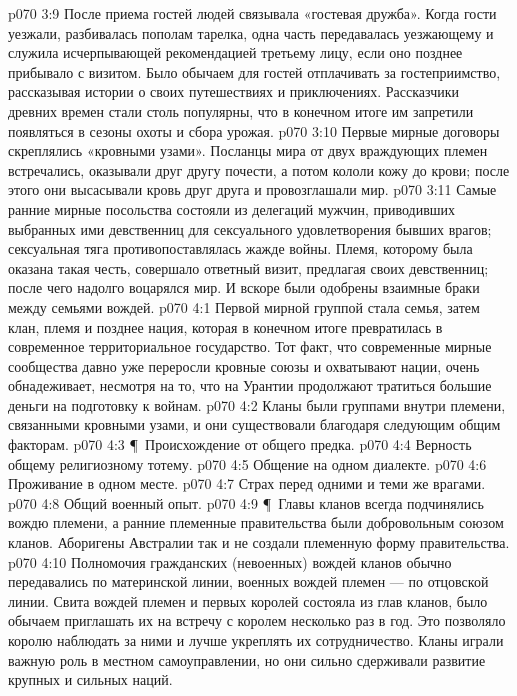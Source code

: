 \vs p070 3:9 После приема гостей людей связывала «гостевая дружба». Когда гости уезжали, разбивалась пополам тарелка, одна часть передавалась уезжающему и служила исчерпывающей рекомендацией третьему лицу, если оно позднее прибывало с визитом. Было обычаем для гостей отплачивать за гостеприимство, рассказывая истории о своих путешествиях и приключениях. Рассказчики древних времен стали столь популярны, что в конечном итоге им запретили появляться в сезоны охоты и сбора урожая.
\vs p070 3:10 Первые мирные договоры скреплялись «кровными узами». Посланцы мира от двух враждующих племен встречались, оказывали друг другу почести, а потом кололи кожу до крови; после этого они высасывали кровь друг друга и провозглашали мир.
\vs p070 3:11 Самые ранние мирные посольства состояли из делегаций мужчин, приводивших выбранных ими девственниц для сексуального удовлетворения бывших врагов; сексуальная тяга противопоставлялась жажде войны. Племя, которому была оказана такая честь, совершало ответный визит, предлагая своих девственниц; после чего надолго воцарялся мир. И вскоре были одобрены взаимные браки между семьями вождей.
\vs p070 4:1 Первой мирной группой стала семья, затем клан, племя и позднее нация, которая в конечном итоге превратилась в современное территориальное государство. Тот факт, что современные мирные сообщества давно уже переросли кровные союзы и охватывают нации, очень обнадеживает, несмотря на то, что на Урантии продолжают тратиться большие деньги на подготовку к войнам.
\vs p070 4:2 Кланы были группами внутри племени, связанными кровными узами, и они существовали благодаря следующим общим факторам.
\vs p070 4:3 \P\ \bibnobreakspace Происхождение от общего предка.
\vs p070 4:4 \bibnobreakspace Верность общему религиозному тотему.
\vs p070 4:5 \bibnobreakspace Общение на одном диалекте.
\vs p070 4:6 \bibnobreakspace Проживание в одном месте.
\vs p070 4:7 \bibnobreakspace Страх перед одними и теми же врагами.
\vs p070 4:8 \bibnobreakspace Общий военный опыт.
\vs p070 4:9 \P\ Главы кланов всегда подчинялись вождю племени, а ранние племенные правительства были добровольным союзом кланов. Аборигены Австралии так и не создали племенную форму правительства.
\vs p070 4:10 Полномочия гражданских (невоенных) вождей кланов обычно передавались по материнской линии, военных вождей племен --- по отцовской линии. Свита вождей племен и первых королей состояла из глав кланов, было обычаем приглашать их на встречу с королем несколько раз в год. Это позволяло королю наблюдать за ними и лучше укреплять их сотрудничество. Кланы играли важную роль в местном самоуправлении, но они сильно сдерживали развитие крупных и сильных наций.
